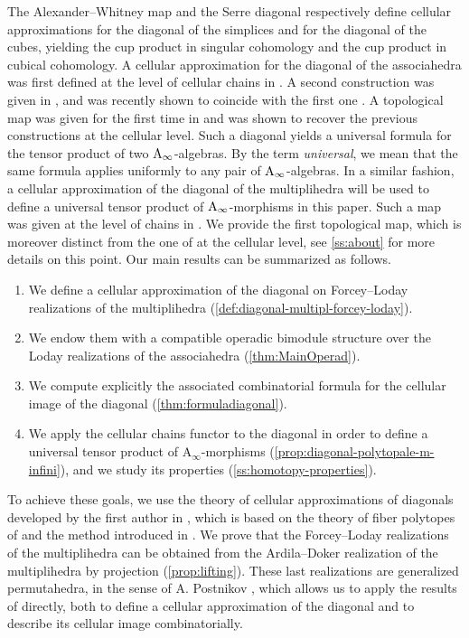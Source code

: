 \documentclass[10pt]{amsart}
\theoremstyle{remark}
\begin{document}
The Alexander--Whitney map \cite{EilenbergMacLane53} and the Serre diagonal \cite{Serre51} respectively define cellular approximations for the diagonal of the simplices and for the diagonal of the cubes, yielding the cup product in singular cohomology and the cup product in cubical cohomology.
A cellular approximation for the diagonal of the associahedra was first defined at the level of cellular chains in \cite{SaneblidzeUmble04}. 
A second construction was given in \cite{MarklShnider06}, and was recently shown to coincide with the first one \cite{saneblidzeComparingDiagonalsAssociahedra2022a}. 
A topological map was given for the first time in \cite{MTTV19} and was shown to recover the previous constructions at the cellular level. 
Such a diagonal yields a universal formula for the tensor product of two $\mathrm{A}_\infty$-algebras.
By the term \textit{universal}, we mean that the same formula applies uniformly to any pair of $\mathrm{A}_\infty$-algebras.
In a similar fashion, a cellular approximation of the diagonal of the multiplihedra will be used to define a universal tensor product of $\mathrm{A}_\infty$-morphisms in this paper.
Such a map was given at the level of chains in \cite{SaneblidzeUmble04}. We provide the first topological map, which is moreover distinct from the one of \cite{SaneblidzeUmble04} at the cellular level, see \cref{ss:about} for more details on this point.
Our main results can be summarized as follows.
\begin{enumerate}
  \item We define a cellular approximation of the diagonal on Forcey--Loday realizations of the multiplihedra (\cref{def:diagonal-multipl-forcey-loday}).
  \item We endow them with a compatible operadic bimodule structure over the Loday realizations of the associahedra (\cref{thm:MainOperad}).
  \item We compute explicitly the associated combinatorial formula for the cellular image of the diagonal (\cref{thm:formuladiagonal}).
  \item We apply the cellular chains functor to the diagonal in order to define a universal tensor product of $\mathrm{A}_\infty$-morphisms (\cref{prop:diagonal-polytopale-m-infini}), and we study its properties (\cref{ss:homotopy-properties}).
\end{enumerate}

To achieve these goals, we use the theory of cellular approximations of diagonals developed by the first author in \cite{LA21}, which is based on the theory of fiber polytopes of \cite{BilleraSturmfels92} and the method introduced in \cite{MTTV19}.
We prove that the Forcey--Loday realizations of the multiplihedra \cite{Forcey08} can be obtained from the Ardila--Doker realization of the multiplihedra \cite{AD13} by projection (\cref{prop:lifting}).
These last realizations are generalized permutahedra, in the sense of A. Postnikov \cite{Postnikov09}, which allows us to apply the results of \cite{LA21} directly, both to define a cellular approximation of the diagonal and to describe its cellular image combinatorially.
\end{document}

